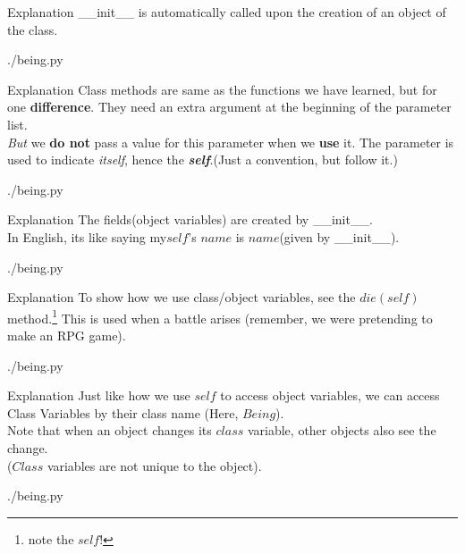 \documentclass{beamer}
\begin{document}
\begin{frame}{Explanation}
  \_\_init\_\_ is automatically called upon the creation of an object of the
  class.
  \begin{lstinputlisting}[firstline=7, lastline=14]
    {./being.py}
  \end{lstinputlisting}
\end{frame}

\begin{frame}{Explanation}
  Class methods are same as the functions we have learned, but for one
  \textbf{difference}. They need an extra argument at the beginning of the
  parameter list.\\\textit{But} we \textbf{do not} pass a value for this parameter when we
  \textbf{use} it. The parameter is used to indicate \textit{itself}, hence the
  \textit{\textbf{self}}.(Just a convention, but follow it.)
  \begin{lstinputlisting}[firstline=5, lastline=8]
    {./being.py}
  \end{lstinputlisting}
\end{frame}

\begin{frame}{Explanation}
  The fields(object variables) are created by \_\_init\_\_.\\
  In English, its like saying my$self$'s $name$ is $name$(given by
  \_\_init\_\_).
  \begin{lstinputlisting}[firstline=7, lastline=12]
    {./being.py}
  \end{lstinputlisting}
\end{frame}

\begin{frame}{Explanation}
  To show how we use class/object variables, see the $die(self)$
  method.\footnote{note the $self$!}
  This is used when a battle arises (remember, we were pretending to make an RPG game).
  \begin{lstinputlisting}[firstline=17, lastline=19]
    {./being.py}
  \end{lstinputlisting}
\end{frame}

\begin{frame}{Explanation}
  Just like how we use $self$ to access object variables, we can access Class
  Variables by their class name (Here, $Being$).\\
  Note that when an object changes its $class$ variable, other objects also see
  the change.\\($Class$ variables are not unique to the object).
  \begin{lstinputlisting}[firstline=20, lastline=22]
    {./being.py}
  \end{lstinputlisting}
\end{frame}
\end{document}
